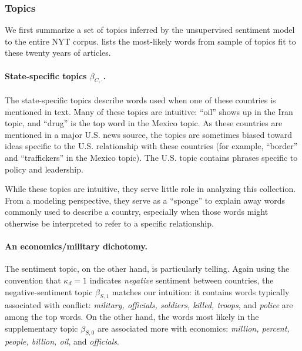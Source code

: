 
\subsubsection*{Topics}
We first summarize a set of topics inferred by the unsupervised
sentiment model to the entire NYT corpus.
 lists the most-likely words
from sample of topics fit to these twenty years of articles.

\paragraph{State-specific topics $\beta_{C,\cdot}$.}  The
state-specific topics describe words used when one of these countries
is mentioned in text.  Many of these topics are intuitive: ``oil''
shows up in the Iran topic, and ``drug'' is the top word in the Mexico
topic.  As these countries are mentioned in a major U.S. news source,
the topics are sometimes biased toward ideas specific to the
U.S. relationship with these countries (for example, ``border'' and
``traffickers'' in the Mexico topic).  The U.S. topic contains phrases
specific to policy and leadership.

While these topics are intuitive, they serve little role in analyzing
this collection.  From a modeling perspective, they serve as a
``sponge'' to explain away words commonly used to describe a country,
especially when those words might otherwise be interpreted to refer to
a specific relationship.

\paragraph{An economics/military dichotomy.}
The sentiment topic, on the other hand, is particularly telling.
Again using the convention that $\kappa_d=1$ indicates \emph{negative}
sentiment between countries, the negative-sentiment topic
$\beta_{S,1}$ matches our intuition: it contains words typically
associated with conflict: \emph{military, officials, soldiers, killed,
  troops}, and \emph{police} are among the top words. On the other
hand, the words most likely in the supplementary topic $\beta_{S,0}$
are associated more with economics: \emph{million, percent, people,
  billion, oil}, and \emph{officials}.

